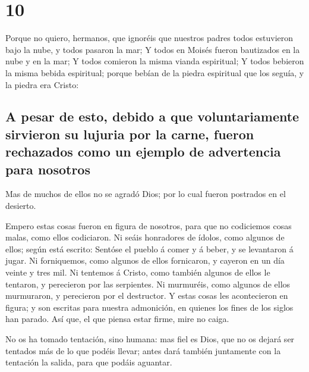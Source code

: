 \hypertarget{section-9}{%
\section{10}\label{section-9}}

 Porque no quiero, hermanos, que ignoréis que nuestros
padres todos estuvieron bajo la nube, y todos pasaron la mar;
 Y todos en Moisés fueron bautizados en la nube y en la
mar;  Y todos comieron la misma vianda espiritual;
 Y todos bebieron la misma bebida espiritual; porque
bebían de la piedra espiritual que los seguía, y la piedra era Cristo:

\hypertarget{a-pesar-de-esto-debido-a-que-voluntariamente-sirvieron-su-lujuria-por-la-carne-fueron-rechazados-como-un-ejemplo-de-advertencia-para-nosotros}{%
\subsection{A pesar de esto, debido a que voluntariamente sirvieron su
lujuria por la carne, fueron rechazados como un ejemplo de advertencia
para
nosotros}\label{a-pesar-de-esto-debido-a-que-voluntariamente-sirvieron-su-lujuria-por-la-carne-fueron-rechazados-como-un-ejemplo-de-advertencia-para-nosotros}}

 Mas de muchos de ellos no se agradó Dios; por lo cual
fueron postrados en el desierto.

 Empero estas cosas fueron en figura de nosotros, para que
no codiciemos cosas malas, como ellos codiciaron.  Ni
seáis honradores de ídolos, como algunos de ellos; según está escrito:
Sentóse el pueblo á comer y á beber, y se levantaron á jugar.
 Ni forniquemos, como algunos de ellos fornicaron, y
cayeron en un día veinte y tres mil.  Ni tentemos á
Cristo, como también algunos de ellos le tentaron, y perecieron por las
serpientes.  Ni murmuréis, como algunos de ellos
murmuraron, y perecieron por el destructor.  Y estas
cosas les acontecieron en figura; y son escritas para nuestra
admonición, en quienes los fines de los siglos han parado.
 Así que, el que piensa estar firme, mire no caiga.

 No os ha tomado tentación, sino humana: mas fiel es
Dios, que no os dejará ser tentados más de lo que podéis llevar; antes
dará también juntamente con la tentación la salida, para que podáis
aguantar.

